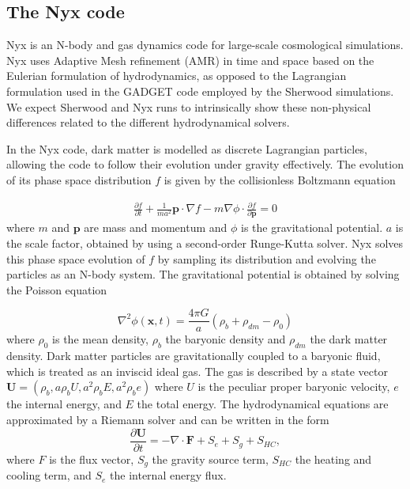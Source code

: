 \subsection{The Nyx code}
Nyx \cite{Almgren_2013} is an N-body and gas dynamics code for large-scale cosmological simulations. Nyx uses Adaptive Mesh refinement (AMR) in time and space based on the Eulerian formulation of hydrodynamics, as opposed to the Lagrangian formulation used in the GADGET code employed by the Sherwood simulations. We expect Sherwood and Nyx runs to intrinsically show these non-physical differences related to the different hydrodynamical solvers.

In the Nyx code, dark matter is modelled as discrete Lagrangian particles, allowing the code to follow their evolution under gravity effectively. The evolution of its phase space distribution $f$ is given by the collisionless Boltzmann equation

\begin{equation}
    \begin{aligned}\frac{\partial f}{\partial t}+\frac{1}{ma^2}\mathbf{p}\cdot\nabla f-m\nabla\phi\cdot\frac{\partial f}{\partial\mathbf{p}}=0\end{aligned}
\end{equation}
where $m$ and $\mathbf{p}$ are mass and momentum and $\phi$ is the gravitational potential. $a$ is the scale factor, obtained by using a second-order Runge-Kutta solver.
Nyx solves this phase space evolution of $f$ by sampling its distribution and evolving the particles as an N-body system. The gravitational potential is obtained by solving the Poisson equation

\begin{equation}
    \nabla^2\phi(\mathbf{x},t)=\frac{4\pi G}{a}(\rho_b+\rho_{dm}-\rho_0)
\end{equation}
where $\rho_0$ is the mean density, $\rho_b$ the baryonic density and $\rho_{dm}$ the dark matter density.
Dark matter particles are gravitationally coupled to a baryonic fluid, which is treated as an inviscid ideal gas. The gas is described by a state vector $\mathbf{U}=(\rho_b,a\rho_bU,a^2\rho_bE,a^2\rho_be)$ where $U$ is the peculiar proper baryonic velocity, $e$ the internal energy, and $E$ the total energy.
The hydrodynamical equations are approximated by a Riemann solver and can be written in the form
\begin{equation}
    \frac{\partial\mathbf{U}}{\partial t}=-\nabla\cdot\mathbf{F}+S_e+S_g+S_{HC},
\end{equation}
where $F$ is the flux vector, $S_g$ the gravity source term, $S_{HC}$ the heating and cooling term, and $S_e$ the internal energy flux.

